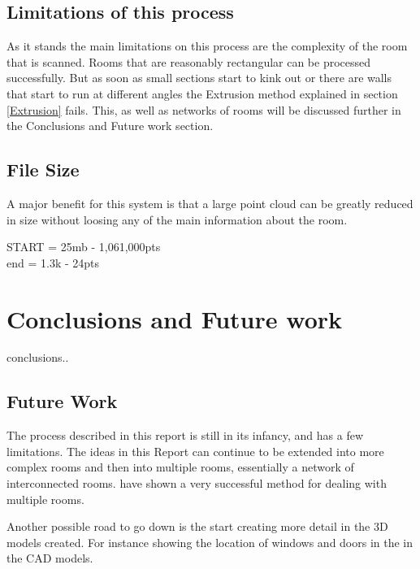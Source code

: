 	\section{Limitations of this process}
		As it stands the main limitations on this process are the complexity of the room that is scanned. Rooms that are reasonably rectangular can be processed successfully. But as soon as small sections start to kink out or there are walls that start to run at different angles the Extrusion method explained in section \ref{Extrusion} fails. This, as well as networks of rooms will be discussed further in the Conclusions and Future work section.
		
	\section{File Size}
		A major benefit for this system is that a large point cloud can be greatly reduced in size without loosing any of the main information about the room. 
		
		
		
		START = 25mb - 1,061,000pts
		\\
		end  = 1.3k - 24pts
	
	
\chapter{Conclusions and Future work}

conclusions..

\section{Future Work}
	The process described in this report is still in its infancy, and has a few limitations. The ideas in this Report can continue to be extended into more complex rooms and then into multiple rooms, essentially a network of interconnected rooms. \cite{mura_automatic_2014} have shown a very successful method for dealing with multiple rooms.
	
	Another possible road to go down is the start creating more detail in the 3D models created. For instance showing the location of windows and doors in the in the CAD models.
	
